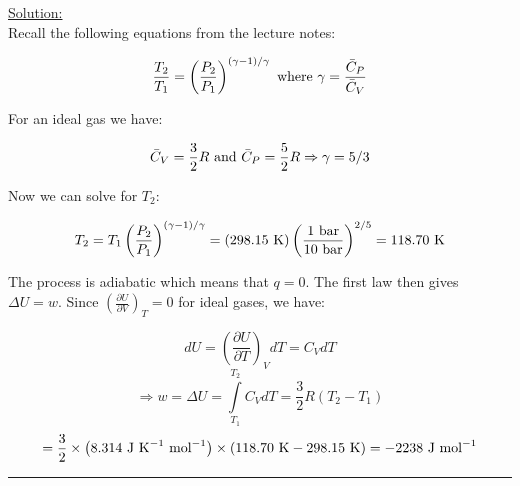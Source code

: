\noindent
\underline{Solution:}\\

Recall the following equations from the lecture notes:

$$\frac{T_2}{T_1} = \left(\frac{P_2}{P_1}\right)^{(\gamma - 1)/\gamma}\textnormal{ where }\gamma = \frac{\bar{C}_P}{\bar{C}_V}$$

For an ideal gas we have:

$$\bar{C}_V = \frac{3}{2}R\textnormal{ and }\bar{C}_P = \frac{5}{2}R \Rightarrow \gamma = 5/3$$

Now we can solve for $T_2$:

$$T_2 = T_1 \left(\frac{P_2}{P_1}\right)^{(\gamma - 1)/\gamma} = (298.15\textnormal{ K})\left(\frac{1\textnormal{ bar}}{10\textnormal{ bar}}\right)^{2/5} = 118.70\textnormal{ K}$$

The process is adiabatic which means that $q = 0$. The first law then gives $\Delta U = w$. Since $\left(\frac{\partial U}{\partial V}\right)_T = 0$ for ideal gases, we have:

$$dU = \left(\frac{\partial U}{\partial T}\right)_V dT = C_VdT$$
$$\Rightarrow w = \Delta U = \int\limits_{T_1}^{T_2} C_VdT = \frac{3}{2}R\left(T_2 - T_1\right)$$
$$= \frac{3}{2}\times\left(8.314\textnormal{ J K}^{-1}\textnormal{ mol}^{-1}\right)\times\left(118.70\textnormal{ K} - 298.15\textnormal{ K}\right) = -2238\textnormal{ J mol}^{-1}$$

\hrule\vspace{0.5cm}
